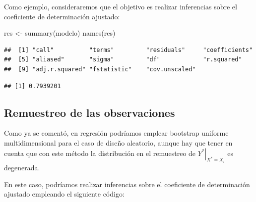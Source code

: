 \documentclass[
]{book}
\newenvironment{Shaded}{\begin{snugshade}}{\end{snugshade}}
\newcommand{\AttributeTok}[1]{\textcolor[rgb]{0.77,0.63,0.00}{#1}}
\newcommand{\ControlFlowTok}[1]{\textcolor[rgb]{0.13,0.29,0.53}{\textbf{#1}}}
\newcommand{\DecValTok}[1]{\textcolor[rgb]{0.00,0.00,0.81}{#1}}
\newcommand{\FunctionTok}[1]{\textcolor[rgb]{0.00,0.00,0.00}{#1}}
\newcommand{\NormalTok}[1]{#1}
\newcommand{\OtherTok}[1]{\textcolor[rgb]{0.56,0.35,0.01}{#1}}
\newcommand{\SpecialCharTok}[1]{\textcolor[rgb]{0.00,0.00,0.00}{#1}}
\theoremstyle{break}
\theoremstyle{nonumberplain}
\begin{document}
Como ejemplo, consideraremos que el objetivo es realizar inferencias sobre el coeficiente de determinación ajustado:

\begin{Shaded}
\begin{Highlighting}[]
\NormalTok{res }\OtherTok{\textless{}{-}} \FunctionTok{summary}\NormalTok{(modelo)}
\FunctionTok{names}\NormalTok{(res)}
\end{Highlighting}
\end{Shaded}

\begin{verbatim}
##  [1] "call"          "terms"         "residuals"     "coefficients" 
##  [5] "aliased"       "sigma"         "df"            "r.squared"    
##  [9] "adj.r.squared" "fstatistic"    "cov.unscaled"
\end{verbatim}

\begin{Shaded}
\end{Shaded}

\begin{verbatim}
## [1] 0.7939201
\end{verbatim}

\hypertarget{boot-unif-reg}{%
\subsection{Remuestreo de las observaciones}\label{boot-unif-reg}}

Como ya se comentó, en regresión podríamos emplear bootstrap uniforme multidimensional para el caso de diseño aleatorio, aunque hay que tener en cuenta que con este método la distribución en el remuestreo de \(\left. Y^{\ast}\right\vert _{X^{\ast}=X_i}\) es degenerada.

En este caso, podríamos realizar inferencias sobre el coeficiente de determinación ajustado empleando el siguiente código:

\begin{Shaded}
\end{Shaded}
\end{document}
